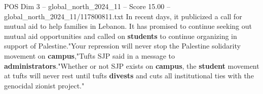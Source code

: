 \begin{textsample}{POS Dim 3 – global\_north\_2024\_11 – Score 15.00 – global\_north\_2024\_11/117800811.txt}
In recent days, it publicized a call for mutual aid to help families in Lebanon.
It has promised to continue seeking out mutual aid opportunities and called on \textbf{students} to continue organizing in support of Palestine."Your repression will never stop the Palestine solidarity movement on \textbf{campus},"Tufts SJP said in a message to \textbf{administrators}."Whether or not SJP exists on \textbf{campus}, the \textbf{student} movement at tufts will never rest until tufts \textbf{divests} and cuts all institutional ties with the genocidal zionist project."

\end{textsample}
